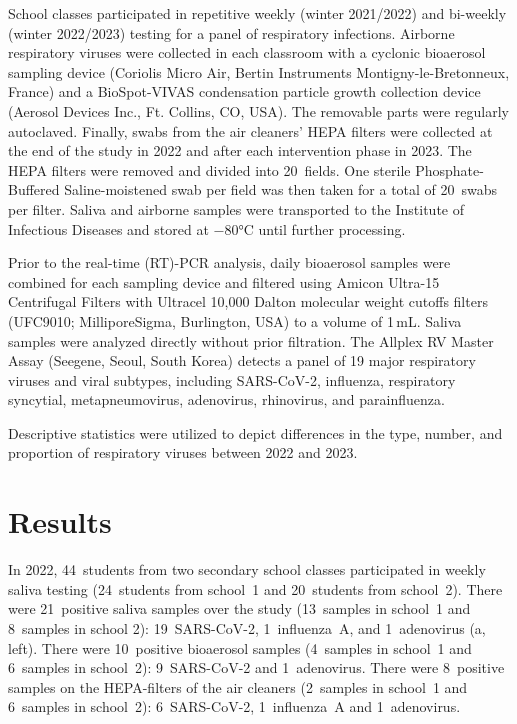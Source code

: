 \documentclass[fleqn,11pt]{wlscirep}
\begin{document}
School classes participated in repetitive weekly (winter 2021/2022) and bi-weekly (winter 2022/2023) testing for a panel of respiratory infections. Airborne respiratory viruses were collected in each classroom with a cyclonic bioaerosol sampling device (Coriolis Micro Air, Bertin Instruments Montigny-le-Bretonneux, France) and a BioSpot-VIVAS condensation particle growth collection device (Aerosol Devices Inc., Ft. Collins, CO, USA)\cite{Lednicky2016AST}. The removable parts were regularly autoclaved. Finally, swabs from the air cleaners' HEPA filters were collected at the end of the study in 2022 and after each intervention phase in 2023. The HEPA filters were removed and divided into 20~fields. One sterile Phosphate-Buffered Saline-moistened swab per field was then taken for a total of 20~swabs per filter. Saliva and airborne samples were transported to the Institute of Infectious Diseases and stored at $-$80°C until further processing\cite{Huber2021}. 

Prior to the real-time (RT)-PCR analysis, daily bioaerosol samples were combined for each sampling device and filtered using Amicon Ultra-15 Centrifugal Filters with Ultracel 10,000 Dalton molecular weight cutoffs filters (UFC9010; MilliporeSigma, Burlington, USA) to a volume of 1\,mL. Saliva samples were analyzed directly without prior filtration. The Allplex RV Master Assay (Seegene, Seoul, South Korea) detects a panel of 19 major respiratory viruses and viral subtypes, including SARS-CoV-2, influenza, respiratory syncytial, metapneumovirus, adenovirus, rhinovirus, and parainfluenza. 

Descriptive statistics were utilized to depict differences in the type, number, and proportion of respiratory viruses between 2022 and 2023.

\section*{Results}

In 2022, 44~students from two secondary school classes participated in weekly saliva testing (24~students from school~1 and 20~students from school~2). There were 21~positive saliva samples over the study (13~samples in school~1 and 8~samples in school 2): 19~SARS-CoV-2, 1~influenza~A, and 1~adenovirus (a, left). There were 10~positive bioaerosol samples (4~samples in school~1 and 6~samples in school~2): 9~SARS-CoV-2 and 1~adenovirus. There were 8~positive samples on the HEPA-filters of the air cleaners (2~samples in school~1 and 6~samples in school~2): 6~SARS-CoV-2, 1~influenza~A and 1~adenovirus. 
\end{document}
